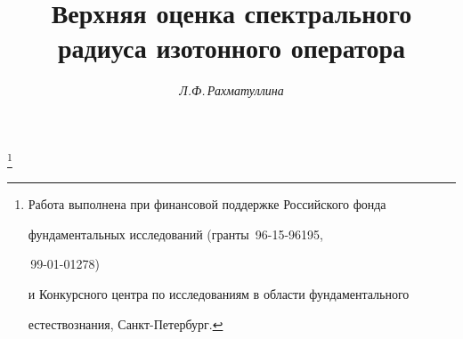 









\newcommand{\eqdef}{\overset{\mathrm{def}}{=}{}}


\newcommand{\vraisup}{\operatornamewithlimits{vrai\;sup}}


\newcommand{\mes}{\operatorname{mes}}


\newcommand{\const}{\operatorname{const}}


\newcommand{\arctg}{\operatorname{arctg}}


\newcommand{\vraiinf}{\operatornamewithlimits{vrai\;inf}}


\newcommand{\var}{\operatornamewithlimits{var}}


\newcommand{\tts}[1]{}







\setcounter{page}{56}















\author{\it Л.Ф.\,Рахматуллина}




\title{Верхняя оценка спектрального радиуса изотонного оператора}


\thanks{Работа выполнена при финансовой поддержке Российского фонда


фундаментальных исследований (гранты \No\,96-15-96195,


\No\,99-01-01278)


и Конкурсного центра по исследованиям в области фундаментального


естествознания, Санкт-Петербург.}


